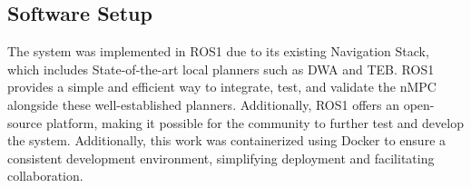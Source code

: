 \documentclass[conference]{IEEEtran}
\begin{document}
\subsection{Software Setup}

The system was implemented in ROS1 due to its existing Navigation Stack, which includes State-of-the-art local planners such as DWA and TEB. ROS1 provides a simple and efficient way to integrate, test, and validate the nMPC alongside these well-established planners. Additionally, ROS1 offers an open-source platform, making it possible for the community to further test and develop the system. Additionally, this work was containerized using Docker to ensure a consistent development environment, simplifying deployment and facilitating collaboration.





\end{document}
